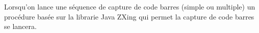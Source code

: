 \begin{figure}[htbp]
  \begin{center}
    \leavevmode
    \hspace{4cm}
  \end{center}
\end{figure}

Lorsqu'on lance une séquence de capture de code barres (simple ou multiple) un procédure basée sur la librarie Java ZXing qui permet la capture de code barres se lancera.
\newpage{}


